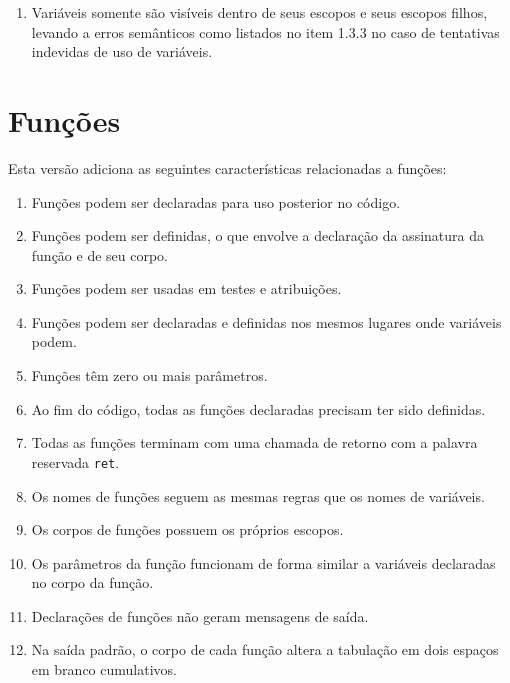 \documentclass{article}
\newenvironment{smallenum}{
    \vspace{-1mm}
    \begin{enumerate}[label=\roman*.]
    \setlength{\parskip}{0pt}
    \setlength{\itemsep}{2pt}
}{
    \vspace{-2mm}
    \end{enumerate}
}
\begin{document}
\begin{smallenum}

\item Variáveis somente são visíveis dentro de seus escopos e seus escopos
    filhos, levando a erros semânticos como listados no item 1.3.3 no caso
    de tentativas indevidas de uso de variáveis.

\end{smallenum}

\section{Funções}

Esta versão adiciona as seguintes características relacionadas a funções:

\begin{smallenum}

\item Funções podem ser declaradas para uso posterior no código.

\item Funções podem ser definidas, o que envolve a declaração da assinatura da
    função e de seu corpo.

\item Funções podem ser usadas em testes e atribuições.

\item Funções podem ser declaradas e definidas nos mesmos lugares onde
    variáveis podem.

\item Funções têm zero ou mais parâmetros.

\item Ao fim do código, todas as funções declaradas precisam ter sido
    definidas.

\item Todas as funções terminam com uma chamada de retorno com a palavra
    reservada \texttt{ret}.

\item Os nomes de funções seguem as mesmas regras que os nomes de variáveis.

\item Os corpos de funções possuem os próprios escopos.

\item Os parâmetros da função funcionam de forma similar a variáveis
    declaradas no corpo da função.

\item Declarações de funções não geram mensagens de saída.

\item Na saída padrão, o corpo de cada função altera a tabulação em dois
    espaços em branco cumulativos.

\end{smallenum}
\end{document}
